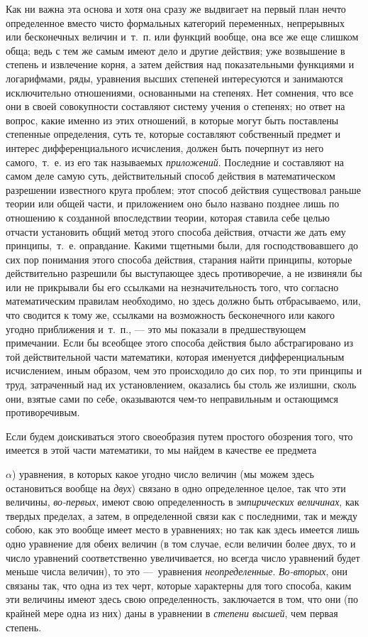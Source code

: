 Как ни важна эта основа и хотя она сразу же выдвигает на первый план нечто
определенное вместо чисто формальных категорий переменных, непрерывных или
бесконечных величин и~т.~п. или функций вообще, она все же еще слишком
обща; ведь с тем же самым имеют дело и другие действия; уже возвышение в
степень и извлечение корня, а затем действия над показательными функциями и
логарифмами, ряды, уравнения высших степеней интересуются и занимаются
исключительно отношениями, основанными на степенях. Нет сомнения, что все
они в своей совокупности составляют систему учения о степенях; но ответ на
вопрос, какие именно из этих отношений, в которые могут быть поставлены
степенные определения, суть те, которые составляют собственный предмет и
интерес дифференциального исчисления, должен быть почерпнут из него
самого,~т.~е. из его так называемых {\em приложений}.
Последние и составляют на самом деле самую суть, действительный способ
действия в математическом разрешении известного круга проблем; этот способ
действия существовал раньше теории или общей части, и приложением оно было
названо позднее лишь по отношению к созданной впоследствии теории, которая
ставила себе целью отчасти установить общий метод этого способа действия,
отчасти же дать ему принципы,~т.~е. оправдание. Какими тщетными были, для
господствовавшего до сих пор понимания этого способа действия, старания
найти принципы, которые действительно разрешили бы выступающее здесь
противоречие, а не извиняли бы или не прикрывали бы его ссылками на
незначительность того, что согласно математическим правилам необходимо, но
здесь должно быть отбрасываемо, или, что сводится к тому же, ссылками на
возможность бесконечного или какого угодно приближения и~т.~п., — это мы
показали в предшествующем примечании. Если бы всеобщее этого способа
действия было абстрагировано из той действительной части математики,
которая именуется дифференциальным исчислением, иным образом, чем это
происходило до сих пор, то эти принципы и труд, затраченный над их
установлением, оказались бы столь же излишни, сколь они, взятые сами по
себе, оказываются чем-то неправильным и остающимся противоречивым.

Если будем доискиваться этого своеобразия путем простого обозрения того, что
имеется в этой части математики, то мы найдем в качестве ее предмета

$\alpha $) уравнения, в которых какое угодно число величин (мы можем здесь
остановиться вообще на {\em двух}) связано в одно
определенное целое, так что эти величины,
{\em во-первых}, имеют свою определенность в
{\em эмпирических величинах}, как твердых пределах, а
затем, в определенной связи как с последними, так и между собою, как это
вообще имеет место в уравнениях; но так как здесь имеется лишь одно
уравнение для обеих величин (в том случае, если величин более двух, то и
число уравнений соответственно увеличивается, но всегда число уравнений
будет меньше числа величин), то это —~уравнения
{\em неопределенные}.
{\em Во-вторых}, они связаны так, что одна из тех черт,
которые характерны для того способа, каким эти величины имеют здесь свою
определенность, заключается в том, что они (по крайней мере одна из них)
даны в уравнении в {\em степени высшей}, чем первая
степень.

